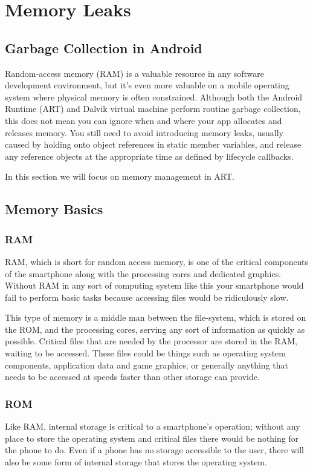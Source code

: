 
\chapter{Memory Leaks}


\section{Garbage Collection in Android}
Random-access memory (RAM) is a valuable resource in any software development environment, but it's even more valuable on a mobile operating system where physical memory is often constrained. Although both the Android Runtime (ART) and Dalvik virtual machine perform routine garbage collection, this does not mean you can ignore when and where your app allocates and releases memory. You still need to avoid introducing memory leaks, usually caused by holding onto object references in static member variables, and release any reference objects at the appropriate time as defined by lifecycle callbacks.

In this section we will focus on memory management in ART.

\section{Memory Basics}

\subsection{RAM}
RAM, which is short for random access memory, is one of the critical components of the smartphone along with the processing cores and dedicated graphics. Without RAM in any sort of computing system like this your smartphone would fail to perform basic tasks because accessing files would be ridiculously slow.

This type of memory is a middle man between the file-system, which is stored on the ROM, and the processing cores, serving any sort of information as quickly as possible. Critical files that are needed by the processor are stored in the RAM, waiting to be accessed. These files could be things such as operating system components, application data and game graphics; or generally anything that needs to be accessed at speeds faster than other storage can provide.

\subsection{ROM}
Like RAM, internal storage is critical to a smartphone’s operation; without any place to store the operating system and critical files there would be nothing for the phone to do. Even if a phone has no storage accessible to the user, there will also be some form of internal storage that stores the operating system.

